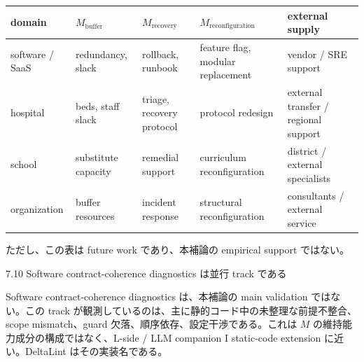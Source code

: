 \documentclass[12pt,a4paper]{article}
\begin{document}
{\def\LTcaptype{table} %
\begin{longtable}[]{@{}
  >{\raggedright\arraybackslash}p{}
  >{\raggedright\arraybackslash}p{}
  >{\raggedright\arraybackslash}p{}
  >{\raggedright\arraybackslash}p{}
  >{\raggedright\arraybackslash}p{}@{}}
\toprule\noalign{}
\begin{minipage}[b]{\linewidth}\raggedright
domain
\end{minipage} & \begin{minipage}[b]{\linewidth}\raggedright
\(M_{\mathrm{buffer}}\)
\end{minipage} & \begin{minipage}[b]{\linewidth}\raggedright
\(M_{\mathrm{recovery}}\)
\end{minipage} & \begin{minipage}[b]{\linewidth}\raggedright
\(M_{\mathrm{reconfiguration}}\)
\end{minipage} & \begin{minipage}[b]{\linewidth}\raggedright
external supply
\end{minipage} \\
\midrule\noalign{}
\endhead
\bottomrule\noalign{}
\endlastfoot
software / SaaS & redundancy, slack & rollback, runbook & feature flag, modular replacement & vendor / SRE support \\
hospital & beds, staff slack & triage, recovery protocol & protocol redesign & external transfer / regional support \\
school & substitute capacity & remedial support & curriculum reconfiguration & district / external specialists \\
organization & buffer resources & incident response & structural reconfiguration & consultants / external service \\
\end{longtable}
}

ただし、この表は future work であり、本補論の empirical support ではない。

7.10 Software contract-coherence diagnostics は並行 track である

Software contract-coherence diagnostics は、本補論の main validation ではない。この track が観測しているのは、主に静的コード中の未整理な前提不整合、scope mismatch、guard 欠落、順序依存、設定干渉である。これは \(M\) の維持能力成分の構成ではなく、L-side / LLM companion I static-code extension に近い。DeltaLint はその実装名である。
\end{document}
